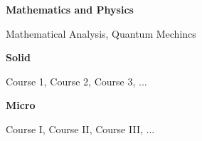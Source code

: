 
\newcommand{\levelentry}[1]{\item \textbf{#1}}
\newenvironment{cvcourses}
{
    \begin{cvlist}\item\small
}
{
    \normalsize\end{cvlist}
}

\begin{cvlist}
    \levelentry{Mathematics and Physics}
    \begin{cvcourses}
        Mathematical Analysis, Quantum Mechincs
    \end{cvcourses}

    \levelentry{Solid}
    \begin{cvcourses}
        Course 1, Course 2, Course 3, ...
    \end{cvcourses}
    
    \levelentry{Micro}
    \begin{cvcourses}
        Course I, Course II, Course III, ...
    \end{cvcourses}

\end{cvlist}

\endinput